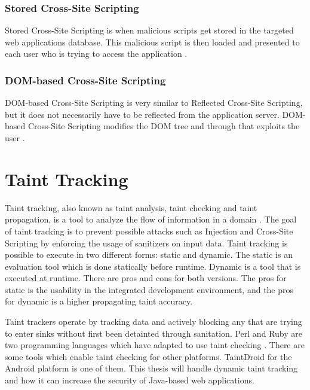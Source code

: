 \subsubsection{Stored Cross-Site Scripting}
Stored Cross-Site Scripting is when malicious scripts get stored in the targeted web applications database. This malicious script is then loaded and presented to each user who is trying to access the application \parencite{Secure_Web}.



\subsubsection{DOM-based Cross-Site Scripting}
DOM-based Cross-Site Scripting is very similar to Reflected Cross-Site Scripting, but it does not necessarily have to be reflected from the application server. DOM-based Cross-Site Scripting modifies the DOM tree and through that exploits the user \parencite{Secure_Web}.



\section{Taint Tracking}
\label{DynamicTaintTracking}
Taint tracking, also known as taint analysis, taint checking and taint propagation, is a tool to analyze the flow of information in a domain \parencite{Pan2015}. The goal of taint tracking is to prevent possible attacks such as Injection and Cross-Site Scripting by enforcing the usage of sanitizers on input data. Taint tracking is possible to execute in two different forms: static and dynamic. The static is an evaluation tool which is done statically before runtime. Dynamic is a tool that is executed at runtime. There are pros and cons for both versions. The pros for static is the usability in the integrated development environment, and the pros for dynamic is a higher propagating taint accuracy. 

Taint trackers operate by tracking data and actively blocking any that are trying to enter sinks without first been detainted through sanitation. Perl and Ruby are two programming languages which have adapted to use taint checking \parencite{perl, ruby}. There are some tools which enable taint checking for other platforms. TaintDroid \parencite{Ma2010} for the Android platform is one of them. This thesis will handle dynamic taint tracking and how it can increase the security of Java-based web applications.

